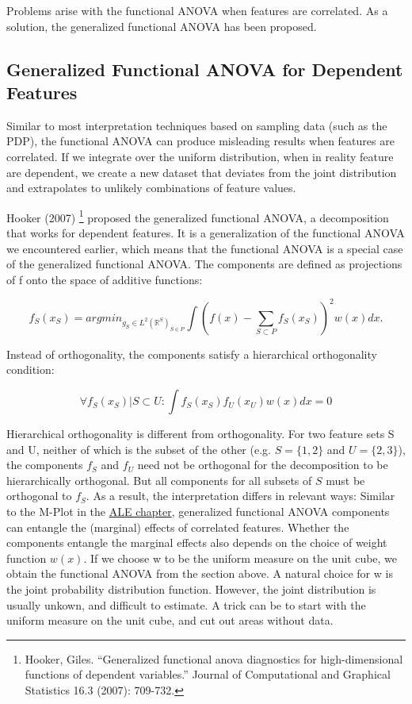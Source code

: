 \documentclass[12pt,]{krantz}
\begin{document}
Problems arise with the functional ANOVA when features are correlated.
As a solution, the generalized functional ANOVA has been proposed.

\subsection{Generalized Functional ANOVA for Dependent
Features}\label{generalized-functional-anova-for-dependent-features}

Similar to most interpretation techniques based on sampling data (such
as the PDP), the functional ANOVA can produce misleading results when
features are correlated. If we integrate over the uniform distribution,
when in reality feature are dependent, we create a new dataset that
deviates from the joint distribution and extrapolates to unlikely
combinations of feature values.

Hooker (2007) \footnote{Hooker, Giles. ``Generalized functional anova
  diagnostics for high-dimensional functions of dependent variables.''
  Journal of Computational and Graphical Statistics 16.3 (2007):
  709-732.} proposed the generalized functional ANOVA, a decomposition
that works for dependent features. It is a generalization of the
functional ANOVA we encountered earlier, which means that the functional
ANOVA is a special case of the generalized functional ANOVA. The
components are defined as projections of f onto the space of additive
functions:

\[f_S(x_S) = argmin_{g_S \in L^2(\mathbb{R}^S)_{S \in P}} \int \left(f(x)  - \sum_{S \subset P} f_S(x_S)\right)^2 w(x)dx.\]

Instead of orthogonality, the components satisfy a hierarchical
orthogonality condition:

\[\forall f_S(x_S)| S \subset U: \int f_S(x_S) f_U(x_U) w(x)dx = 0\]

Hierarchical orthogonality is different from orthogonality. For two
feature sets S and U, neither of which is the subset of the other (e.g.
\(S=\{1,2\}\) and \(U=\{2,3\}\)), the components \(f_S\) and \(f_U\)
need not be orthogonal for the decomposition to be hierarchically
orthogonal. But all components for all subsets of \(S\) must be
orthogonal to \(f_S\). As a result, the interpretation differs in
relevant ways: Similar to the M-Plot in the \protect\hyperlink{ale}{ALE
chapter}, generalized functional ANOVA components can entangle the
(marginal) effects of correlated features. Whether the components
entangle the marginal effects also depends on the choice of weight
function \(w(x)\). If we choose w to be the uniform measure on the unit
cube, we obtain the functional ANOVA from the section above. A natural
choice for w is the joint probability distribution function. However,
the joint distribution is usually unkown, and difficult to estimate. A
trick can be to start with the uniform measure on the unit cube, and cut
out areas without data.
\end{document}

